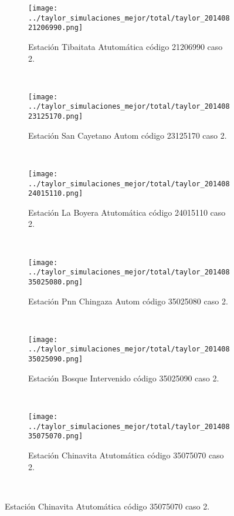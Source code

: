 \begin{figure}[H]\ContinuedFloat
\centering
\begin{subfigure}[normla]{0.4\textwidth}
\texttt{[image: ../taylor\_simulaciones\_mejor/total/taylor\_20140821206990.png]}
\caption{Estación Tibaitata Atutomática código 21206990 caso 2.}
\end{subfigure}
~
\begin{subfigure}[normla]{0.4\textwidth}
\texttt{[image: ../taylor\_simulaciones\_mejor/total/taylor\_20140823125170.png]}
\caption{Estación San Cayetano Autom código 23125170 caso 2.}
\end{subfigure}
~
\begin{subfigure}[normla]{0.4\textwidth}
\texttt{[image: ../taylor\_simulaciones\_mejor/total/taylor\_20140824015110.png]}
\caption{Estación La Boyera Atutomática código 24015110 caso 2.}
\end{subfigure}
~
\begin{subfigure}[normla]{0.4\textwidth}
\texttt{[image: ../taylor\_simulaciones\_mejor/total/taylor\_20140835025080.png]}
\caption{Estación Pnn Chingaza Autom código 35025080 caso 2.}
\end{subfigure}
~
\begin{subfigure}[normla]{0.4\textwidth}
\texttt{[image: ../taylor\_simulaciones\_mejor/total/taylor\_20140835025090.png]}
\caption{Estación Bosque Intervenido código 35025090 caso 2.}
\end{subfigure}
~
\begin{subfigure}[normla]{0.4\textwidth}
\texttt{[image: ../taylor\_simulaciones\_mejor/total/taylor\_20140835075070.png]}
\caption{Estación Chinavita Atutomática código 35075070 caso 2.}
\end{subfigure}
~
\end{figure}
 
